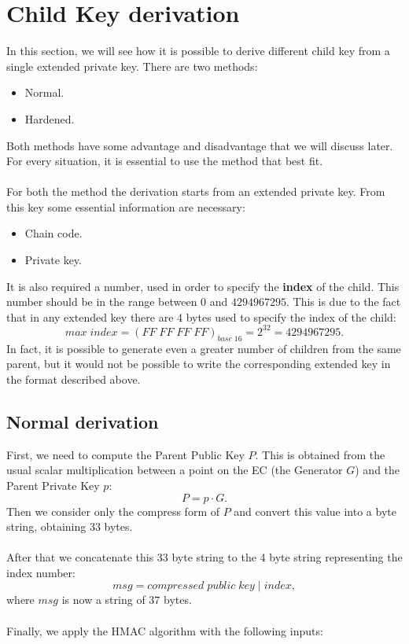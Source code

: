 \section{Child Key derivation}
In this section, we will see how it is possible to derive different child key from a single extended private key. There are two methods:
\begin{itemize}
	\item Normal.
	\item Hardened.
\end{itemize}
Both methods have some advantage and disadvantage that we will discuss later. For every situation, it is essential to use the method that best fit.
\\ \\
For both the method the derivation starts from an extended private key. From this key some essential information are necessary:
\begin{itemize}[label=$\star$]
	\item Chain code.
	\item Private key.
\end{itemize}
It is also required a number, used in order to specify the \textbf{index} of the child. This number should be in the range between $0$ and $4294967295$. This is due to the fact that in any extended key there are 4 bytes used to specify the index of the child:
\begin{equation*}
max \; index=(FF\;FF\;FF\;FF)_{base \; 16} = 2^{32} = 4294967295.
\end{equation*}
In fact, it is possible to generate even a greater number of children from the same parent, but it would not be possible to write the corresponding extended key in the format described above.


\subsection{Normal derivation}

First, we need to compute the Parent Public Key $P$. This is obtained from the usual scalar multiplication between a point on the EC (the Generator $G$) and the Parent Private Key $p$:
\begin{equation*}
P=p\cdot G.
\end{equation*}
Then we consider only the compress form of $P$ and convert this value into a byte string, obtaining 33 bytes.
\\ \\
After that we concatenate this 33 byte string to the 4 byte string representing the index number:
\begin{equation*}
msg = compressed \; public\;key \;|\; index,
\end{equation*}
where $msg$ is now a string of $37$ bytes. \\ \\
Finally, we apply the HMAC algorithm with the following inputs:


